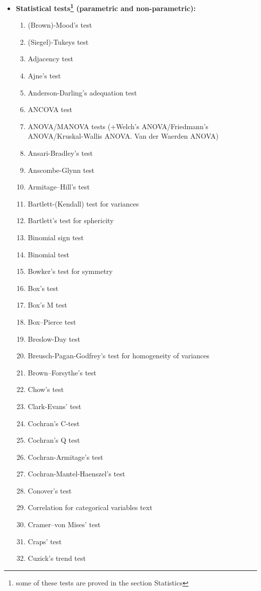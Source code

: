 \begin{itemize}
		\item \textbf{Statistical tests\footnote{some of these tests are proved in the section Statistics} (parametric and non-parametric):}
		\begin{multicols}{3}
		\begin{enumerate}
			\item (Brown)-Mood's test
			\item (Siegel)-Tukeys test
			\item Adjacency test
			\item Ajne's test
			\item Anderson-Darling's adequation test
			\item ANCOVA test
			\item ANOVA/MANOVA tests (+Welch's ANOVA/Friedmann's ANOVA/Kruskal-Wallis ANOVA. Van der Waerden ANOVA)
			\item Ansari-Bradley's test
			\item Anscombe-Glynn test
			\item Armitage–Hill's test
			\item Bartlett-(Kendall) test for variances
			\item Bartlett's test for sphericity
			\item Binomial sign test
			\item Binomial test 
			\item Bowker's test for symmetry
			\item Box's test
			\item Box's M test
			\item Box–Pierce test
			\item Breslow-Day test
			\item Breusch-Pagan-Godfrey's test for homogeneity of variances
			\item Brown–Forsythe's test
			\item Chow's test
			\item Clark-Evans' test
			\item Cochran's C-test
			\item Cochran's Q test
			\item Cochran-Armitage's test
			\item Cochran-Mantel-Haenszel's test
			\item Conover's test
			\item Correlation for categorical variables text
			\item Cramer–von Mises' test
			\item Craps' test
			\item Cuzick's trend test

\end{enumerate}
\end{multicols}
\end{itemize}
